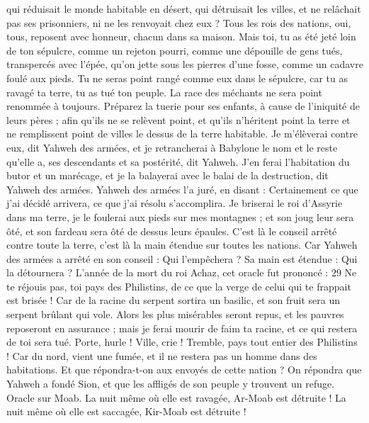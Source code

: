 \begin{multicols}{2}
qui réduisait le monde habitable en désert, qui détruisait les villes, et ne relâchait pas ses prisonniers, ni ne les renvoyait chez eux ?
Tous les rois des nations, oui, tous, reposent avec honneur, chacun dans sa maison.
Mais toi, tu as été jeté loin de ton sépulcre, comme un rejeton pourri, comme une dépouille de gens tués, transpercés avec l'épée, qu'on jette sous les pierres d'une fosse, comme un cadavre foulé aux pieds.
Tu ne seras point rangé comme eux dans le sépulcre, car tu as ravagé ta terre, tu as tué ton peuple. La race des méchants ne sera point renommée à toujours.
Préparez la tuerie pour ses enfants, à cause de l'iniquité de leurs pères ; afin qu'ils ne se relèvent point, et qu'ils n'héritent point la terre et ne remplissent point de villes le dessus de la terre habitable.
Je m'élèverai contre eux, dit Yahweh des armées, et je retrancherai à Babylone le nom et le reste qu'elle a, ses descendants et sa postérité, dit Yahweh.
J'en ferai l'habitation du butor et un marécage, et je la balayerai avec le balai de la destruction, dit Yahweh des armées.
Yahweh des armées l'a juré, en disant : Certainement ce que j'ai décidé arrivera, ce que j'ai résolu s'accomplira.
Je briserai le roi d'Assyrie dans ma terre, je le foulerai aux pieds sur mes montagnes ; et son joug leur sera ôté, et son fardeau sera ôté de dessus leurs épaules.
C'est là le conseil arrêté contre toute la terre, c'est là la main étendue sur toutes les nations.
Car Yahweh des armées a arrêté en son conseil : Qui l'empêchera ? Sa main est étendue : Qui la détournera ?
L'année de la mort du roi Achaz, cet oracle fut prononcé : 29 Ne te réjouis pas, toi pays des Philistins, de ce que la verge de celui qui te frappait est brisée ! Car de la racine du serpent sortira un basilic, et son fruit sera un serpent brûlant qui vole.
Alors les plus misérables seront repus, et les pauvres reposeront en assurance ; mais je ferai mourir de faim ta racine, et ce qui restera de toi sera tué.
Porte, hurle ! Ville, crie ! Tremble, pays tout entier des Philistins ! Car du nord, vient une fumée, et il ne restera pas un homme dans des habitations.
Et que répondra-t-on aux envoyés de cette nation ? On répondra que Yahweh a fondé Sion, et que les affligés de son peuple y trouvent un refuge.
\VerseOne{}Oracle sur Moab. La nuit même où elle est ravagée, Ar-Moab est détruite ! La nuit même où elle est saccagée, Kir-Moab est détruite !

\end{multicols}
